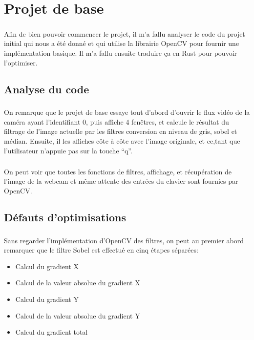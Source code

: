 \documentclass{report}
\begin{document}
\chapter{Projet de base}

\paragraph{} Afin de bien pouvoir commencer le projet, il m'a fallu analyser le
code du projet initial qui nous a été donné et qui utilise la librairie OpenCV
pour fournir une implémentation basique. Il m'a fallu ensuite traduire ça en
Rust pour pouvoir l'optimiser.

\section{Analyse du code}

\paragraph{} On remarque que le projet de base essaye tout d'abord d'ouvrir le
flux vidéo de la caméra ayant l'identifiant 0, puis affiche 4 fenêtres, et
calcule le résultat du filtrage de l'image actuelle par les filtres conversion
en niveau de gris, sobel et médian. Ensuite, il les affiches côte à côte avec
l'image originale, et ce,tant que l'utilisateur n'appuie pas sur la touche
``q''.

\paragraph{} On peut voir que toutes les fonctions de filtres, affichage, et
récupération de l'image de la webcam et même attente des entrées du clavier
sont fournies par OpenCV.

\section{Défauts d'optimisations}

\paragraph{} Sans regarder l'implémentation d'OpenCV des filtres, on peut au
premier abord remarquer que le filtre Sobel est effectué en cinq étapes
séparées:

\begin{itemize}
	\item Calcul du gradient X
	\item Calcul de la valeur absolue du gradient X
	\item Calcul du gradient Y
	\item Calcul de la valeur absolue du gradient Y
	\item Calcul du gradient total
\end{itemize}
\end{document}
